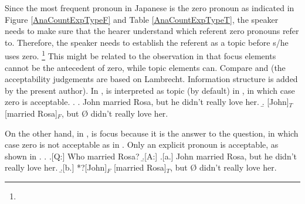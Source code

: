 Since the most frequent pronoun in Japanese is the zero pronoun as indicated in Figure \ref{AnaCountExpTypeF} and Table \ref{AnaCountExpTypeT},
the speaker needs to make sure that the hearer understand which referent zero pronouns refer to.
Therefore, the speaker needs to establish the referent as a topic
before s/he uses zero.%
 \footnote{}
This might be related to the observation in  that
focus elements cannot be the antecedent of zero,
while topic elements can.
Compare \Next and \NNext (the acceptability judgements are based on Lambrecht. Information structure is added by the present author).
In \Next,  is interpreted as topic (by default) in \Next[b],
in which case zero is acceptable.
%
\ex.\label{WO:TopicAppearClause-Initially:Ex:John}
 \a. John married Rosa, but he didn't really love her.
 \b. [John]$_{T}$ [married Rosa]$_{F}$, but {\O} didn't really love her.

On the other hand,
in \Next,
 is focus because it is the answer to the question,
in which case zero is not acceptable as in \Next[b].
Only an explicit pronoun is acceptable, as shown in \Next[a].
%
\ex.\label{WO:TopicAppearClause-Initially:Ex:Rosa}
 \a.[Q:] Who married Rosa?
 \b.[A:]
   \a.[a.] John married Rosa, but he didn't really love her.
   \b.[b.] *?[John]$_{F}$ [married Rosa]$_{T}$, but {\O} didn't really love her.


